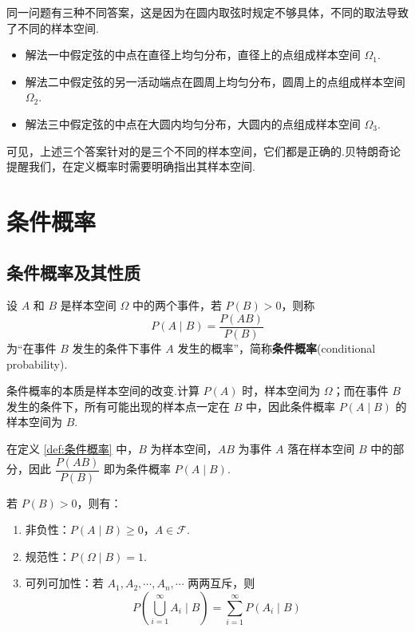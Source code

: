 \begin{note}
    \indent 同一问题有三种不同答案，这是因为在圆内取弦时规定不够具体，不同的取法导致了不同的样本空间.

    \begin{itemize}
        \item 解法一中假定弦的中点在直径上均匀分布，直径上的点组成样本空间 $\varOmega_1$.
        \item 解法二中假定弦的另一活动端点在圆周上均匀分布，圆周上的点组成样本空间 $\varOmega_2$.
        \item 解法三中假定弦的中点在大圆内均匀分布，大圆内的点组成样本空间 $\varOmega_3$.
    \end{itemize}

    可见，上述三个答案针对的是三个不同的样本空间，它们都是正确的.贝特朗奇论提醒我们，在定义概率时需要明确指出其样本空间.
\end{note}

\section{条件概率}

\subsection{条件概率及其性质}

\begin{definition}
    \indent 设 $A$ 和 $B$ 是样本空间 $\varOmega$ 中的两个事件，若 $P(B)>0$，则称
    $$
    P(A \mid B) = \dfrac{P(AB)}{P(B)}
    $$
    为“在事件 $B$ 发生的条件下事件 $A$ 发生的概率”，简称\textbf{条件概率}(conditional probability).
\end{definition}

\begin{note}
    \indent 条件概率的本质是样本空间的改变.计算 $P(A)$ 时，样本空间为 $\varOmega$；而在事件 $B$ 发生的条件下，所有可能出现的样本点一定在 $B$ 中，因此条件概率 $P(A \mid B)$ 的样本空间为 $B$.

    在定义 \ref{def:条件概率} 中，$B$ 为样本空间，$AB$ 为事件 $A$ 落在样本空间 $B$ 中的部分，因此 $\dfrac{P(AB)}{P(B)}$ 即为条件概率 $P(A \mid B)$.
\end{note}

\begin{property}
    \indent 若 $P(B) > 0$，则有：
    \begin{enumerate}
        \item 非负性：$P(A \mid B) \geqslant 0$，$A \in \mathcal{F}$.
        \item 规范性：$P(\varOmega \mid B) = 1$.
        \item 可列可加性：若 $A_1, A_2, \cdots, A_n, \cdots$ 两两互斥，则
        $$
        P \left( \bigcup_{i=1}^{\infty} A_i \mid B \right) = \sum_{i=1}^{\infty} P(A_i \mid B)
        $$
    \end{enumerate}
\end{property}

